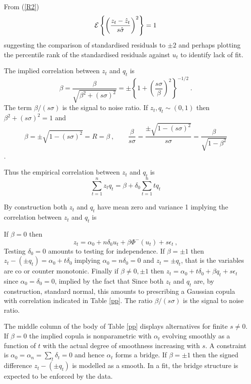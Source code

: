 \documentclass[authoryear]{elsarticle}
\newcommand{\eps}{\epsilon}
\newcommand{\Ex}{{\cal E}}
\newcommand{\eref}[1]{(\ref{#1})}
\newcommand{\tref}[1]{Table \ref{#1}}
\newcommand{\cq}{\ , \qquad}
\begin{document}
From \eref{R2}
$$
\Ex\left\{ \left(\frac{z_{t}-\hat z_{t}}{s\hat\sigma}\right)^2\right\}=1
$$
suggesting  the comparison of standardised residuals  to $\pm 2$ and perhaps plotting the percentile rank of the standardised residuals against $u_t$ to identify  lack of fit.  

   The implied correlation between $z_t$ and $q_t$ is  
$$
\beta=\frac{\beta}{\sqrt{\beta^2+(s\sigma)^2}} = \pm\left\{1+\left(\frac{s\sigma}{\beta}\right)^2\right\}^{-1/2}\ .
$$
The term $\beta/(s\sigma)$ is the signal to noise ratio.  If $z_t, q_t\sim (0,1)$ then $\beta^2+(s\sigma)^2=1$ and  
$$
\beta=\pm\sqrt{1-(s\sigma)^2}=R=\beta \cq \frac{\beta}{s\sigma} = \frac{\pm\sqrt{1-(s\sigma)^2}}{s\sigma} = \frac{\beta}{\sqrt{1-\beta^2}} 
$$.


 Thus the empirical correlation between $z_t$ and $q_t$ is
$$
\sum_{t=1}^n z_tq_t = \beta+\delta_0\sum_{t=1}^n tq_t 
$$




By construction both $z_t$ and $q_t$ have mean zero and variance 1 implying
the correlation between $z_t$ and $q_t$ is


If  $\beta=0$ then 
$$
z_t=\alpha_0 + n\delta_0 u_t+\beta \Phi^-(u_t) +s\eps_t\ ,
$$
    Testing $\delta_0=0$ amounts to testing for independence.  If $\beta=\pm 1$ then 
$z_t-(\pm q_t)=\alpha_0+t\delta_0$ implying $\alpha_0=n\delta_0=0$ and  $z_t=\pm q_t$, that is the variables are co or counter monotonic.   Finally if $\beta\ne 0,\pm 1$ then $z_t=\alpha_0+t\delta_0+\beta q_t+s\eps_t$  since  $\alpha_0=\delta_0=0$, implied by the fact that    Since both $z_t$ and $q_t$ are, by construction, standard normal, this  amounts to prescribing  a Gaussian copula with correlation indicated in \tref{pp}.
The ratio $\beta/(s\sigma)$ is the  signal to noise ratio.

The middle column of the body of \tref{pp} displays alternatives for finite $s\ne 0$.   If $\beta=0$  the implied copula is nonparametric with $\alpha_t$ evolving smoothly as a function of $t$ with the actual degree of smoothness increasing with $s$.  A constraint is $\alpha_0=\alpha_n=\sum_t\delta_t=0$ and hence $\alpha_t$ forms a bridge.  If $\beta=\pm 1$ then the signed difference $z_t-(\pm q_t)$ is modelled as a smooth. In a fit, the  bridge structure is expected to be enforced by the data.
\end{document}
